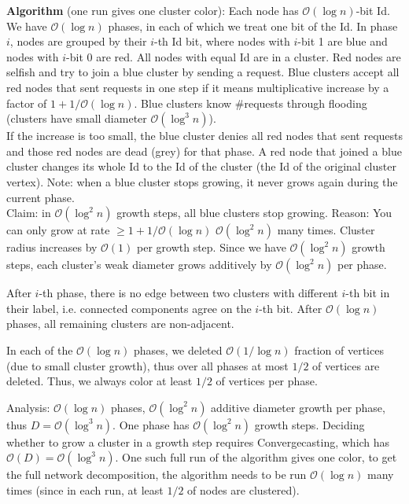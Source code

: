 \documentclass[a4paper, 8pt, landscape]{scrartcl}
\begin{document}
\begin{multicols*}{3}
\textbf{Algorithm} (one run gives one cluster color): Each node has $\mathcal{O}(\log n)$-bit Id. We have $\mathcal{O}(\log n)$ phases, in each of which we treat one bit of the Id. In phase $i$, nodes are grouped by their $i$-th Id bit, where nodes with $i$-bit 1 are {\color{blue}blue} and nodes with $i$-bit 0 are {\color{red}red}. All nodes with equal Id are in a cluster. Red nodes are selfish and try to join a blue cluster by sending a request. Blue clusters accept all red nodes that sent requests in one step if it means multiplicative increase by a factor of $1 + 1/\mathcal{O}(\log n)$. Blue clusters know \#requests through flooding (clusters have small diameter $\mathcal{O}(\log^3 n)$).\\
If the increase is too small, the blue cluster denies all red nodes that sent requests and those red nodes are dead (grey) for that phase. A red node that joined a blue cluster changes its whole Id to the Id of the cluster (the Id of the original cluster vertex). Note: when a blue cluster stops growing, it never grows again during the current phase.\\
Claim: in $\mathcal{O}(\log^2 n)$ growth steps, all blue clusters stop growing. Reason: You can only grow at rate $\geq 1 + 1/\mathcal{O}(\log n)$ $\mathcal{O}(\log^2 n)$ many times. Cluster radius increases by $\mathcal{O}(1)$ per growth step. Since we have $\mathcal{O}(\log^2 n)$ growth steps, each cluster's weak diameter grows additively by $\mathcal{O}(\log^2 n)$ per phase.

After $i$-th phase, there is no edge between two clusters with different $i$-th bit in their label, i.e. connected components agree on the $i$-th bit. After $\mathcal{O}(\log n)$ phases, all remaining clusters are non-adjacent.

In each of the $\mathcal{O}(\log n)$ phases, we deleted $\mathcal{O}(1/\log n)$ fraction of vertices (due to small cluster growth), thus over all phases at most $1/2$ of vertices are deleted. Thus, we always color at least $1/2$ of vertices per phase.

Analysis: $\mathcal{O}(\log n)$ phases, $\mathcal{O}(\log^2 n)$ additive diameter growth per phase, thus $D=\mathcal{O}(\log^3 n)$. One phase has $\mathcal{O}(\log^2 n)$ growth steps. Deciding whether to grow a cluster in a growth step requires Convergecasting, which has $\mathcal{O}(D) = \mathcal{O}(\log^3 n)$. One such full run of the algorithm gives one color, to get the full network decomposition, the algorithm needs to be run $\mathcal{O}(\log n)$ many times (since in each run, at least $1/2$ of nodes are clustered).


\end{multicols*}
\end{document}

